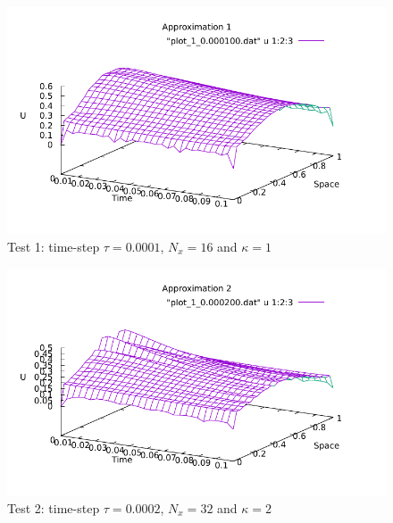\documentclass[10pt]{article}
\begin{document}
 \begin{figure}[H]
 \begin{center}
    \includegraphics[width=1\textwidth]{plot1.pdf}
  \end{center}
  \caption{Test 1: time-step $\tau = 0.0001$, $N_x = 16$ and $\kappa = 1$
  \label{fig:2_01}}
\end{figure}

 \begin{figure}[H]
 \begin{center}
    \includegraphics[width=1\textwidth]{plot2.pdf}
  \end{center}
  \caption{Test 2: time-step $\tau = 0.0002$, $N_x = 32$ and $\kappa = 2$
  \label{fig: 2_001}}
\end{figure}
\end{document}
